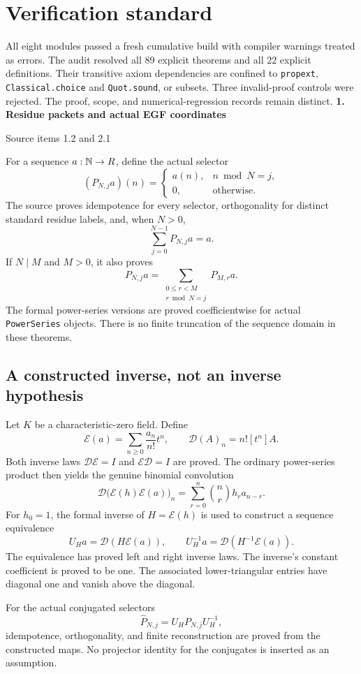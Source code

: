 \documentclass[11pt]{article}
\newcommand{\pageheading}[2]{{\Large\bfseries\color{ink}#1}\par{\small #2}\par\medskip}
\begin{document}
\section*{Verification standard}
All eight modules passed a fresh cumulative build with compiler warnings treated as errors. The audit resolved all 89 explicit theorems and all 22 explicit definitions. Their transitive axiom dependencies are confined to \texttt{propext}, \texttt{Classical.choice} and \texttt{Quot.sound}, or subsets. Three invalid-proof controls were rejected. The proof, scope, and numerical-regression records remain distinct.
\newpage
\pageheading{1. Residue packets and actual EGF coordinates}{Source items 1.2 and 2.1}
For a sequence $a:\mathbb N\to R$, define the actual selector
\[
 (P_{N,j}a)(n)=\begin{cases}a(n),&n\bmod N=j,\\0,&\text{otherwise.}\end{cases}
\]
The source proves idempotence for every selector, orthogonality for distinct standard residue labels, and, when $N>0$,
\[
 \sum_{j=0}^{N-1}P_{N,j}a=a.
\]
If $N\mid M$ and $M>0$, it also proves
\[
 P_{N,j}a=\sum_{\substack{0\le r<M\\r\bmod N=j}}P_{M,r}a.
\]
The formal power-series versions are proved coefficientwise for actual \texttt{PowerSeries} objects. There is no finite truncation of the sequence domain in these theorems.

\subsection*{A constructed inverse, not an inverse hypothesis}
Let $K$ be a characteristic-zero field. Define
\[
 \mathcal E(a)=\sum_{n\ge0}\frac{a_n}{n!}t^n,\qquad
 \mathcal D(A)_n=n![t^n]A.
\]
Both inverse laws $\mathcal D\mathcal E=I$ and $\mathcal E\mathcal D=I$ are proved. The ordinary power-series product then yields the genuine binomial convolution
\[
 \mathcal D\bigl(\mathcal E(h)\mathcal E(a)\bigr)_n
 =\sum_{r=0}^{n}\binom nr h_r a_{n-r}.
\]
For $h_0=1$, the formal inverse of $H=\mathcal E(h)$ is used to construct a sequence equivalence
\[
 U_H a=\mathcal D(H\mathcal E(a)),\qquad
 U_H^{-1}a=\mathcal D(H^{-1}\mathcal E(a)).
\]
The equivalence has proved left and right inverse laws. The inverse's constant coefficient is proved to be one. The associated lower-triangular entries have diagonal one and vanish above the diagonal.

For the actual conjugated selectors
\[
 \widehat P_{N,j}=U_HP_{N,j}U_H^{-1},
\]
idempotence, orthogonality, and finite reconstruction are proved from the constructed maps. No projector identity for the conjugates is inserted as an assumption.
\end{document}
